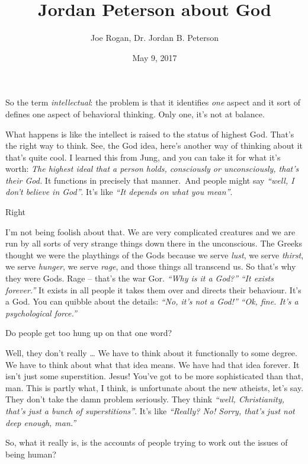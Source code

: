 \documentclass{memoir}
\title{Jordan Peterson about God}
\author{Joe Rogan, Dr. Jordan B. Peterson}
\date{May 9, 2017}
\newcommand{\qq}[1]{\emph{“#1”}}
\begin{document}
\maketitle{}


\begin{drama}

\jrspeaks So the term \emph{intellectual}: the problem is that it identifies \emph{one} aspect and it sort of defines one aspect of behavioral thinking. Only one, it’s not at balance.

\jpspeaks What happens is like the intellect is raised to the status of highest God. That’s the right way to think. See, the God idea, here’s another way of thinking about it that’s quite cool. I learned this from Jung, and you can take it for what it’s worth: \emph{The highest ideal that a person holds, consciously or unconsciously, that’s their God.} It functions in precisely that manner. And people might say \qq{well, I don’t believe in God}. It’s like \qq{It depends on what you mean}.

\jrspeaks Right

\jpspeaks I’m not being foolish about that. We are very complicated creatures and we are run by all sorts of very strange things down there in the unconscious. The Greeks thought we were the playthings of the Gods because we serve \emph{lust}, we serve \emph{thirst}, we serve \emph{hunger}, we serve \emph{rage}, and those things all transcend us. So that’s why they were Gods. Rage -- that’s the war Gor. \qq{Why is it a God?} \qq{It exists forever.} It exists in all people it takes them over and directs their behaviour. It’s a God. You can quibble about the details: \qq{No, it’s not a God!} \qq{Ok, fine. It’s a psychological force.}

\jrspeaks Do people get too hung up on that one word?

\jpspeaks Well, they don’t really \ldots{} We have to think about it functionally to some degree. We have to think about what that idea means. We have had that idea forever. It isn’t just some superstition. Jesus! You’ve got to be more sophisticated than that, man. This is partly what, I think, is unfortunate about the new atheists, let’s say. They don’t take the damn problem seriously. They think \qq{well, Christianity, that’s just a bunch of superstitions}. It’s like \qq{Really? No! Sorry, that’s just not deep enough, man.}

\jrspeaks So, what it really is, is the accounts of people trying to work out the issues of being human?


\end{drama}
\end{document}
